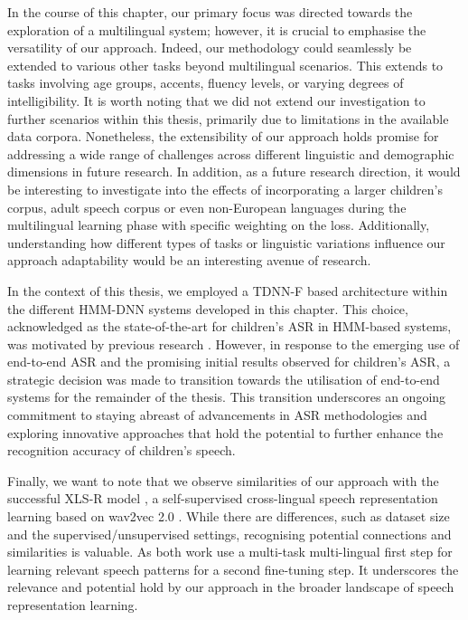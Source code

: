 In the course of this chapter, our primary focus was directed towards the exploration of a multilingual system; however, it is crucial to emphasise the versatility of our approach. Indeed, our methodology could seamlessly be extended to various other tasks beyond multilingual scenarios. This extends to tasks involving age groups, accents, fluency levels, or varying degrees of intelligibility. It is worth noting that we did not extend our investigation to further scenarios within this thesis, primarily due to limitations in the available data corpora. Nonetheless, the extensibility of our approach holds promise for addressing a wide range of challenges across different linguistic and demographic dimensions in future research. In addition, as a future research direction, it would be interesting to investigate into the effects of incorporating a larger children's corpus, adult speech corpus or even non-European languages during the multilingual learning phase with specific weighting on the loss. Additionally, understanding how different types of tasks or linguistic variations influence our approach adaptability would be an interesting avenue of research.

In the context of this thesis, we employed a TDNN-F based architecture within the different HMM-DNN systems developed in this chapter. This choice, acknowledged as the state-of-the-art for children's ASR in HMM-based systems, was motivated by previous research \cite{tdnnf-children}. However, in response to the emerging use of end-to-end ASR and the promising initial results observed for children's ASR, a strategic decision was made to transition towards the utilisation of end-to-end systems for the remainder of the thesis. This transition underscores an ongoing commitment to staying abreast of advancements in ASR methodologies and exploring innovative approaches that hold the potential to further enhance the recognition accuracy of children's speech.

Finally, we want to note that we observe similarities of our approach with the  successful XLS-R model \cite{babu2021xlsr}, a self-supervised cross-lingual speech representation learning based on wav2vec 2.0 \cite{baevski2020wav2vec}. While there are differences, such as dataset size and the supervised/unsupervised settings, recognising potential connections and similarities is valuable. As both work use a multi-task multi-lingual first step for learning relevant speech patterns for a second fine-tuning step. It underscores the relevance and potential hold by our approach in the broader landscape of speech representation learning. 